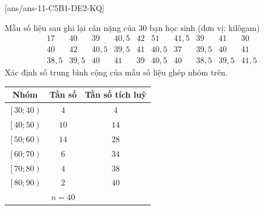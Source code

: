 \caukq
{}[ans/ans-11-C5B1-DE2-KQ]
\begin{ex}%
	Mẫu số liệu sau ghi lại cân nặng của $30$ bạn học sinh (đơn vị: kilôgam)
	\[
		\begin{array}{cccccccccc}
			17 & 40 & 39 & 40{,}5 & 42 & 51 & 41{,}5 & 39 & 41 & 30\\
			40 & 42 & 40{,}5 & 39{,}5 & 41 & 40{,}5 & 37 & 39{,}5 & 40 & 41\\
			38{,}5 & 39{,}5 & 40 & 41 & 39 & 40{,}5 & 40 & 38{,}5 & 39{,}5 & 41{,}5
		\end{array}
	\]
	Xác định số trung bình cộng của mẫu số liệu ghép nhóm trên.
\end{ex}

\begin{ex}%
	{
		\begin{tabular}{|c|c|c|}
			\hline
			\textbf{Nhóm} & \textbf{Tần số} & \textbf{Tần số tích luỹ}\\ 
			\hline
			$\left[30;40\right)$ & $4$ & $4$\\
			$\left[40;50\right)$ & $10$ & $14$\\
			$\left[50;60\right)$ & $14$ & $28$\\
			$\left[60;70\right)$ & $6$ & $34$\\
			$\left[70;80\right)$ & $4$ & $38$\\
			$\left[80;90\right)$ & $2$ & $40$\\
			\hline
			& $n = 40$ &\\
			\hline
		\end{tabular}
	}
\end{ex}

